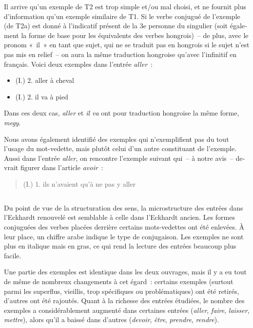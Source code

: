 \documentclass[output=paper,colorlinks,citecolor=brown,arabicfont,chinesefont,booklanguage=french]{langscibook}
\begin{document}
\begin{otherlanguage}{french}
Il arrive qu’un exemple de T2 est trop simple et/ou mal choisi, et ne fournit plus d’information qu’un exemple similaire de T1. Si le verbe conjugué de l’exemple (de T2a) est donné à l’indicatif présent de la 3e personne du singulier (soit également la forme de base pour les équivalents des verbes hongrois)~-- de plus, avec le pronom «~il~» en tant que sujet, qui ne se traduit pas en hongrois si le sujet n’est pas mis en relief~-- on aura la même traduction hongroise qu’avec l’infinitif en français. Voici deux exemples dans l’entrée \emph{aller}~:

\begin{itemize}
    \item (I.) 2. aller à cheval
    \item (I.) 2. il va à pied
\end{itemize}

Dans ces deux cas, \emph{aller} et \emph{il va} ont pour traduction hongroise la même forme, \emph{megy}.

Nous avons également identifié des exemples qui n’exemplifient pas du tout l’usage du mot-vedette, mais plutôt celui d’un autre constituant de l’exemple. Aussi dans l’entrée \emph{aller}, on rencontre l’exemple suivant qui~-- à notre avis~-- devrait figurer dans l’article \emph{avoir}~:

\begin{quote}
    (I.) 1. ils n’avaient qu’à ne pas y aller
\end{quote}

\subsection{\citealt{EckhardtOlah1999} }\label{sec:tillinger:3.8}

Du point de vue de la structuration des sens, la microstructure des entrées dans l’Eckhardt renouvelé est semblable à celle dans l’Eckhardt ancien. Les formes conjuguées des verbes placées derrière certains mots-vedettes ont été enlevées. À leur place, un chiffre arabe indique le type de conjugaison. Les exemples ne sont plus en italique mais en gras, ce qui rend la lecture des entrées beaucoup plus facile.

Une partie des exemples est identique dans les deux ouvrages, mais il y a eu tout de même de nombreux changements à cet égard~: certains exemples (surtout parmi les superflus, vieillis, trop spécifiques ou problématiques) ont été retirés, d’autres ont été rajoutés. Quant à la richesse des entrées étudiées, le nombre des exemples a considérablement augmenté dans certaines entrées (\emph{aller}, \emph{faire}, \emph{laisser}, \emph{mettre}), alors qu’il a baissé dans d’autres (\emph{devoir}, \emph{être}, \emph{prendre}, \emph{rendre}). 


\end{otherlanguage}
\end{document}
